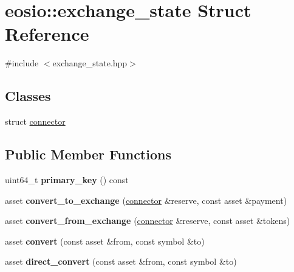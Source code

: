 \hypertarget{structeosio_1_1exchange__state}{}\section{eosio\+:\+:exchange\+\_\+state Struct Reference}
\label{structeosio_1_1exchange__state}


{\ttfamily \#include $<$exchange\+\_\+state.\+hpp$>$}

\subsection*{Classes}
\begin{DoxyCompactItemize}
\item 
struct \mbox{\hyperlink{structeosio_1_1exchange__state_1_1connector}{connector}}
\end{DoxyCompactItemize}
\subsection*{Public Member Functions}
\begin{DoxyCompactItemize}
\item 
\mbox{\label{structeosio_1_1exchange__state_a962eb5ae2f354cf80058dc8243b3885c}} 
uint64\+\_\+t {\bfseries primary\+\_\+key} () const
\item 
\mbox{\label{structeosio_1_1exchange__state_af3a668c9edcd39bf67d3d46e300a81e0}} 
asset {\bfseries convert\+\_\+to\+\_\+exchange} (\mbox{\hyperlink{structeosio_1_1exchange__state_1_1connector}{connector}} \&reserve, const asset \&payment)
\item 
\mbox{\label{structeosio_1_1exchange__state_a2bb928e02fe7af628f0ac4c147ea9670}} 
asset {\bfseries convert\+\_\+from\+\_\+exchange} (\mbox{\hyperlink{structeosio_1_1exchange__state_1_1connector}{connector}} \&reserve, const asset \&tokens)
\item 
\mbox{\label{structeosio_1_1exchange__state_a7167fc8ee89d6d0ce1d0b8db2813a96f}} 
asset {\bfseries convert} (const asset \&from, const symbol \&to)
\item 
\mbox{\label{structeosio_1_1exchange__state_a818976baaa188d24ce61d63e8754e741}} 
asset {\bfseries direct\+\_\+convert} (const asset \&from, const symbol \&to)
\end{DoxyCompactItemize}
